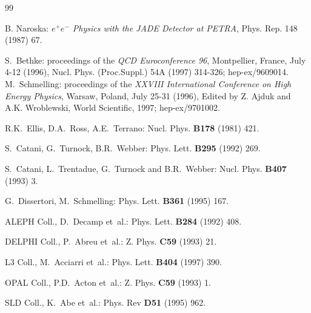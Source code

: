 \documentclass[12pt,a4paper,twoside]{article}
\begin{document}
\begin{thebibliography}{99}



B. Naroska:                         {\em $e^+e^-$ Physics with the JADE
                                    Detector at PETRA},
                                    Phys. Rep. 148 (1987) 67.

S.~Bethke:                          proceedings of the 
                                    {\em QCD Euroconference 96},
                                     Montpellier, France, July 4-12
                                    (1996), Nucl. Phys. (Proc.Suppl.) 54A
                                     (1997) 314-326;
                                     hep-ex/9609014.
M.~Schmelling:                      proceedings of the 
                                    {\em XXVIII International Conference on 
                                         High Energy Physics}, 
                                    Warsaw, Poland, July 25-31 (1996),
                                    Edited by Z. Ajduk and A.K.
                                    Wroblewski, World Scientific, 1997; 
                                    hep-ex/9701002. 

R.K.~Ellis, D.A.~Ross, A.E.~Terrano: Nucl. Phys. {\bf B178} (1981) 421.

S.~Catani, G.~Turnock, B.R.~Webber:  Phys. Lett. {\bf B295} (1992) 269.

S.~Catani, L.~Trentadue, G.~Turnock and B.R.~Webber: 
                                     Nucl. Phys. {\bf B407} (1993) 3.

G.~Dissertori, M.~Schmelling:        Phys. Lett. {\bf B361} (1995) 167.

ALEPH Coll., D.~Decamp et~al.:      Phys. Lett. {\bf B284} (1992) 408.

DELPHI Coll., P.~Abreu et~al.:      Z. Phys. {\bf C59} (1993) 21.

L3 Coll., M.~Acciarri et~al.:        Phys. Lett. {\bf B404} (1997) 390.

OPAL Coll., P.D.~Acton et~al.:      Z. Phys. {\bf C59} (1993) 1.

SLD  Coll., K.~Abe et~al.:          Phys. Rev {\bf D51} (1995) 962.


\end{thebibliography}
\end{document}
